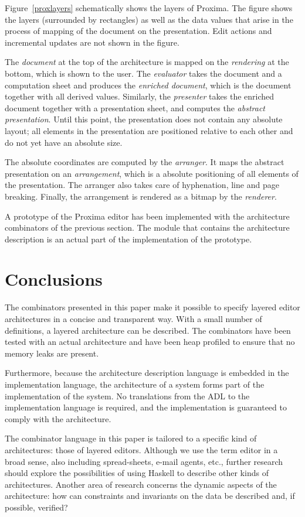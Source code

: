 \par Figure~\ref{proxlayers} schematically shows the layers of
      Proxima. The figure shows the layers (surrounded by rectangles) as well as the
      data values that arise in the process of mapping of the document on the
      presentation. Edit actions and incremental updates are not shown in the
      figure.
\par The {\em document} at the top of the architecture is mapped on the
      {\em rendering} at the bottom, which is shown to the user. The
      {\em evaluator} takes the document and a computation sheet and produces the
      {\em enriched document}, which is the document together with all derived
      values. Similarly, the {\em presenter} takes the enriched document together
      with a presentation sheet, and computes the {\em abstract presentation}.
      Until this point, the presentation does not contain any absolute layout; all
      elements in the presentation are positioned relative to each other and do not
      yet have an absolute size.
\par The absolute coordinates are computed by the {\em arranger}. It maps
      the abstract presentation on an {\em arrangement}, which is a absolute
      positioning of all elements of the presentation. The arranger also takes care
      of hyphenation, line and page breaking. Finally, the arrangement is rendered as
      a bitmap by the {\em renderer}.
\par A prototype of the Proxima editor has been implemented with the
      architecture combinators of the previous section. The module that contains the
      architecture description is an actual part of the implementation of the
      prototype.
\section{Conclusions}
\label{secthaskellconclusions}
\par The combinators presented in this paper make it possible to specify
      layered editor architectures in a concise and transparent way. With a small
      number of definitions, a layered architecture can be described. The combinators
      have been tested with an actual architecture and have been heap profiled to
      ensure that no memory leaks are present.
\par Furthermore, because the architecture description language is embedded
      in the implementation language, the architecture of a system forms part of the
      implementation of the system. No translations from the ADL to the
      implementation language is required, and the implementation is guaranteed to
      comply with the architecture.
\par The combinator language in this paper is tailored to a specific kind of
      architectures: those of layered editors. Although we use the term editor in a
      broad sense, also including spread-sheets, e-mail agents, etc., further
      research should explore the possibilities of using Haskell to describe other
      kinds of architectures. Another area of research concerns the dynamic aspects
      of the architecture: how can constraints and invariants on the data be
      described and, if possible, verified?
